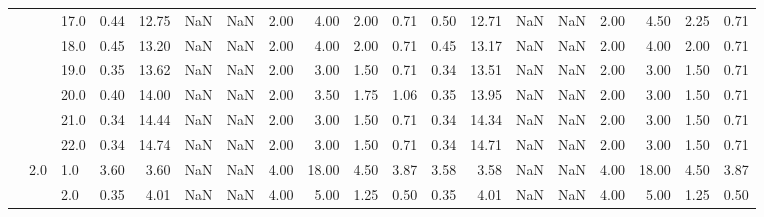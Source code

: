 \begin{tabular}{lllrrrrrrrrrrrrrrrr}
       &     & 17.0 &      0.44 &      12.75 &               NaN &                NaN & 2.00 &   4.00 &             2.00 &                         0.71 &      0.50 &      12.71 &               NaN &                NaN & 2.00 &   4.50 &             2.25 &                         0.71 \\
       &     & 18.0 &      0.45 &      13.20 &               NaN &                NaN & 2.00 &   4.00 &             2.00 &                         0.71 &      0.45 &      13.17 &               NaN &                NaN & 2.00 &   4.00 &             2.00 &                         0.71 \\
       &     & 19.0 &      0.35 &      13.62 &               NaN &                NaN & 2.00 &   3.00 &             1.50 &                         0.71 &      0.34 &      13.51 &               NaN &                NaN & 2.00 &   3.00 &             1.50 &                         0.71 \\
       &     & 20.0 &      0.40 &      14.00 &               NaN &                NaN & 2.00 &   3.50 &             1.75 &                         1.06 &      0.35 &      13.95 &               NaN &                NaN & 2.00 &   3.00 &             1.50 &                         0.71 \\
       &     & 21.0 &      0.34 &      14.44 &               NaN &                NaN & 2.00 &   3.00 &             1.50 &                         0.71 &      0.34 &      14.34 &               NaN &                NaN & 2.00 &   3.00 &             1.50 &                         0.71 \\
       &     & 22.0 &      0.34 &      14.74 &               NaN &                NaN & 2.00 &   3.00 &             1.50 &                         0.71 &      0.34 &      14.71 &               NaN &                NaN & 2.00 &   3.00 &             1.50 &                         0.71 \\
       & 2.0 & 1.0  &      3.60 &       3.60 &               NaN &                NaN & 4.00 &  18.00 &             4.50 &                         3.87 &      3.58 &       3.58 &               NaN &                NaN & 4.00 &  18.00 &             4.50 &                         3.87 \\
       &     & 2.0  &      0.35 &       4.01 &               NaN &                NaN & 4.00 &   5.00 &             1.25 &                         0.50 &      0.35 &       4.01 &               NaN &                NaN & 4.00 &   5.00 &             1.25 &                         0.50 \\

\end{tabular}
